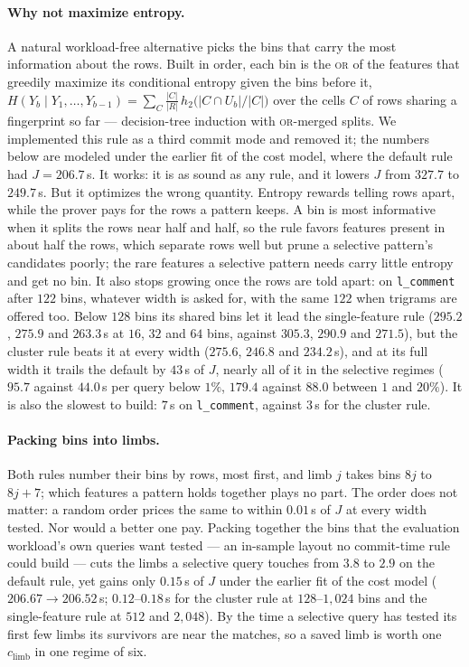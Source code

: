 \paragraph{Why not maximize entropy.}
\label{sec:fp-entropy}
A natural workload-free alternative picks the bins that carry the most
information about the rows. Built in order, each bin is the
\textsc{or} of the features that greedily maximize its conditional
entropy given the bins before it,
$H(Y_b \mid Y_1, \dots, Y_{b-1}) = \sum_C \frac{|C|}{|R|}\,
h_2\bigl(|C \cap U_b| / |C|\bigr)$ over the cells $C$ of rows sharing a
fingerprint so far --- decision-tree induction with \textsc{or}-merged
splits. We implemented this rule as a third commit mode and removed it;
the numbers below are modeled under the earlier fit of the cost model,
where the default rule had $J = 206.7$\,s. It works: it is as sound as
any rule, and it lowers $J$ from $327.7$ to $249.7$\,s. But it optimizes the wrong quantity. Entropy rewards telling
rows apart, while the prover pays for the rows a pattern keeps. A bin is
most informative when it splits the rows near half and half, so the rule
favors features present in about half the rows, which separate rows well
but prune a selective pattern's candidates poorly; the rare features a
selective pattern needs carry little entropy and get no bin. It also
stops growing once the rows are told apart: on \texttt{l\_comment} after
$122$ bins, whatever width is asked for, with the same $122$ when
trigrams are offered too. Below $128$ bins its shared bins let it lead
the single-feature rule ($295.2$, $275.9$ and $263.3$\,s at $16$, $32$
and $64$ bins, against $305.3$, $290.9$ and $271.5$), but the cluster
rule beats it at every width ($275.6$, $246.8$ and $234.2$\,s), and at
its full width it trails the default by $43$\,s of $J$, nearly all of it
in the selective regimes ($95.7$ against $44.0$\,s per query below $1\%$,
$179.4$ against $88.0$ between $1$ and $20\%$). It is also the slowest to
build: $7$\,s on \texttt{l\_comment}, against $3$\,s for the cluster
rule.

\paragraph{Packing bins into limbs.}
Both rules number their bins by rows, most first, and limb $j$ takes
bins $8j$ to $8j + 7$; which features a pattern holds together plays no
part. The order does not matter: a random order prices the same to
within $0.01$\,s of $J$ at every width tested. Nor would a better one pay.
Packing together the bins that the evaluation workload's own queries
want tested --- an in-sample layout no commit-time rule could build ---
cuts the limbs a selective query touches from $3.8$ to $2.9$ on the
default rule, yet gains only $0.15$\,s of $J$ under the earlier fit of
the cost model ($206.67 \to 206.52$\,s;
$0.12$--$0.18$\,s for the cluster rule at $128$--$1{,}024$ bins and the
single-feature rule at $512$ and $2{,}048$). By the time a selective
query has tested its first few limbs its survivors are near the matches,
so a saved limb is worth one $c_{\mathrm{limb}}$ in one regime of six.

